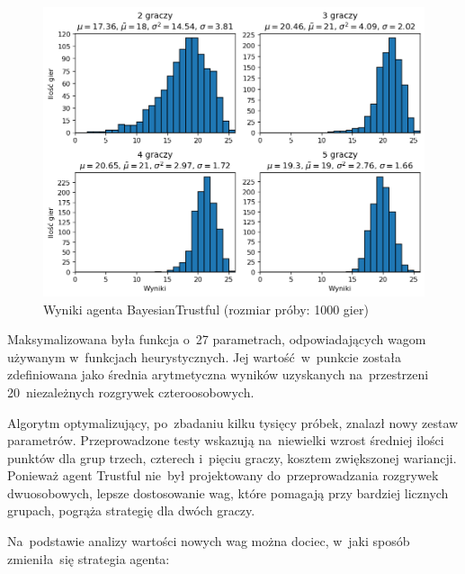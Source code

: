 \documentclass[declaration,shortabstract,inz]{iithesis}
\begin{document}
\begin{figure}[H]
	\centering
	\captionsetup{format=hang}
	\includegraphics[width=\textwidth,height=\textheight,keepaspectratio]{BayesianTrustful.png}
	\caption[Caption]{Wyniki agenta BayesianTrustful (rozmiar próby: 1000 gier)}
	\label{fig:BayesianTrustful}
\end{figure}

Maksymalizowana była funkcja o~27 parametrach, odpowiadających wagom używanym w~funkcjach heurystycznych. Jej wartość w~punkcie została zdefiniowana jako średnia arytmetyczna wyników uzyskanych na~przestrzeni 20~niezależnych rozgrywek czteroosobowych.

Algorytm optymalizujący, po~zbadaniu kilku tysięcy próbek, znalazł nowy zestaw parametrów. Przeprowadzone testy wskazują na~niewielki wzrost średniej ilości punktów dla grup trzech, czterech i~pięciu graczy, kosztem zwiększonej wariancji. Ponieważ agent Trustful nie~był projektowany do~przeprowadzania rozgrywek dwuosobowych, lepsze dostosowanie wag, które pomagają przy bardziej licznych grupach, pogrąża strategię dla dwóch graczy.

Na~podstawie analizy wartości nowych wag można dociec, w~jaki sposób zmieniła~się strategia agenta:
\end{document}
